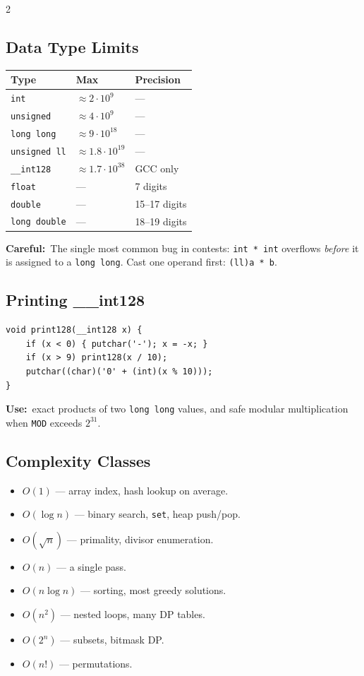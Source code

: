 \documentclass[10pt]{article}
\newcommand{\code}[1]{\texttt{\small #1}}
\newcommand{\uses}[1]{{\color{accent2}\footnotesize\textbf{Use:}}~{\footnotesize #1}\par}
\newcommand{\warn}[1]{{\color{warnc}\footnotesize\textbf{Careful:}}~{\footnotesize #1}\par}
\begin{document}
\begin{multicols}{2}
\subsection{Data Type Limits}
\begin{center}\footnotesize
\begin{tabular}{@{}lll@{}}
\toprule
\textbf{Type} & \textbf{Max} & \textbf{Precision} \\
\midrule
\code{int}          & $\approx 2\cdot 10^{9}$   & --- \\
\code{unsigned}     & $\approx 4\cdot 10^{9}$   & --- \\
\code{long long}    & $\approx 9\cdot 10^{18}$  & --- \\
\code{unsigned ll}  & $\approx 1.8\cdot 10^{19}$& --- \\
\code{\_\_int128}   & $\approx 1.7\cdot 10^{38}$& GCC only \\
\code{float}        & ---                       & 7 digits \\
\code{double}       & ---                       & 15--17 digits \\
\code{long double}  & ---                       & 18--19 digits \\
\bottomrule
\end{tabular}
\end{center}
\warn{The single most common bug in contests: \code{int * int} overflows
\emph{before} it is assigned to a \code{long long}. Cast one operand
first: \code{(ll)a * b}.}

\subsection{Printing \_\_int128}
\begin{lstlisting}
void print128(__int128 x) {
    if (x < 0) { putchar('-'); x = -x; }
    if (x > 9) print128(x / 10);
    putchar((char)('0' + (int)(x % 10)));
}
\end{lstlisting}
\uses{exact products of two \code{long long} values, and safe modular
multiplication when \code{MOD} exceeds $2^{31}$.}

\subsection{Complexity Classes}
\begin{itemize}
    \item $O(1)$ --- array index, hash lookup on average.
    \item $O(\log n)$ --- binary search, \code{set}, heap push/pop.
    \item $O(\sqrt n)$ --- primality, divisor enumeration.
    \item $O(n)$ --- a single pass.
    \item $O(n \log n)$ --- sorting, most greedy solutions.
    \item $O(n^2)$ --- nested loops, many DP tables.
    \item $O(2^n)$ --- subsets, bitmask DP.
    \item $O(n!)$ --- permutations.
\end{itemize}


\end{multicols}
\end{document}
